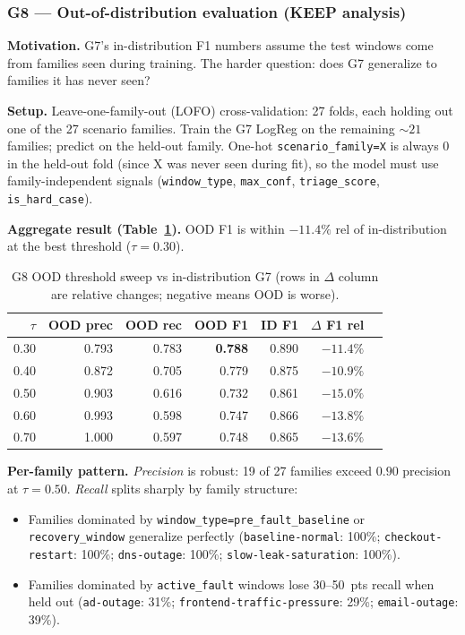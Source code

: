 \subsubsection{G8 --- Out-of-distribution evaluation (KEEP analysis)}

\textbf{Motivation.} G7's in-distribution F1 numbers assume the test windows come from families seen during training. The harder question: does G7 generalize to families it has never seen?

\textbf{Setup.} Leave-one-family-out (LOFO) cross-validation: 27 folds, each holding out one of the 27 scenario families. Train the G7 LogReg on the remaining ${\sim}21$ families; predict on the held-out family. One-hot \texttt{scenario\_family=X} is always 0 in the held-out fold (since X was never seen during fit), so the model must use family-independent signals (\texttt{window\_type}, \texttt{max\_conf}, \texttt{triage\_score}, \texttt{is\_hard\_case}).

\textbf{Aggregate result (Table~\ref{tab:g8-sweep}).} OOD F1 is within $-11.4\%$ rel of in-distribution at the best threshold ($\tau = 0.30$).

\begin{table}[h]
\centering
\caption{G8 OOD threshold sweep vs in-distribution G7 (rows in $\Delta$ column are relative changes; negative means OOD is worse).}
\label{tab:g8-sweep}
\small
\begin{tabular}{rrrrrrr}
\toprule
$\tau$ & OOD prec & OOD rec & OOD F1 & ID F1 & $\Delta$ F1 rel \\
\midrule
0.30 & 0.793 & 0.783 & \textbf{0.788} & 0.890 & $-11.4\%$ \\
0.40 & 0.872 & 0.705 & 0.779 & 0.875 & $-10.9\%$ \\
0.50 & 0.903 & 0.616 & 0.732 & 0.861 & $-15.0\%$ \\
0.60 & 0.993 & 0.598 & 0.747 & 0.866 & $-13.8\%$ \\
0.70 & 1.000 & 0.597 & 0.748 & 0.865 & $-13.6\%$ \\
\bottomrule
\end{tabular}
\end{table}

\textbf{Per-family pattern.} \emph{Precision} is robust: 19 of 27 families exceed $0.90$ precision at $\tau = 0.50$. \emph{Recall} splits sharply by family structure:

\begin{itemize}
\item Families dominated by \texttt{window\_type=pre\_fault\_baseline} or \texttt{recovery\_window} generalize perfectly (\texttt{baseline-normal}: 100\%; \texttt{checkout-restart}: 100\%; \texttt{dns-outage}: 100\%; \texttt{slow-leak-saturation}: 100\%).
\item Families dominated by \texttt{active\_fault} windows lose 30--50~pts recall when held out (\texttt{ad-outage}: 31\%; \texttt{frontend-traffic-pressure}: 29\%; \texttt{email-outage}: 39\%).
\end{itemize}

